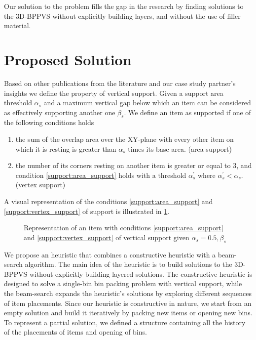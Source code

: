 \documentclass[11pt,a4paper,twocolumn]{article}
\begin{document}
Our solution to the problem fills the gap in the research by finding solutions to the 3D-BPPVS without explicitly building layers, and without the use of filler material.

\section{Proposed Solution}

Based on other publications from the literature and our case study partner's insights we define the property of vertical support.
Given a support area threshold $\alpha_s$ and a maximum vertical gap below which an item can be considered as effectively supporting another one $\beta_s$. We define an item as supported if one of the following conditions holds
\begin{enumerate}[label={\textbf{Condition \arabic*}.},ref={\arabic*},leftmargin=*]
    \item the sum of the overlap area over the XY-plane with every other item on which it is resting is greater than $\alpha_s$ times its base area. (area support) \label{support:area_support}
    \item the number of its corners resting on another item is greater or equal to 3, and condition \ref{support:area_support} holds with a threshold $\alpha^\prime_s$ where $\alpha^\prime_s < \alpha_s$. (vertex support) \label{support:vertex_support}
\end{enumerate}
A visual representation of the conditions \ref{support:area_support} and \ref{support:vertex_support} of support is illustrated in \cref{fig:support}.

\begin{figure}[h]
    \resizebox{\columnwidth}{!}{%
    
    }
    \caption{Representation of an item with conditions \ref{support:area_support} and \ref{support:vertex_support} of vertical support given $\alpha_s = 0.5, \beta_s$}
    \label{fig:support}
\end{figure}

We propose an heuristic that combines a constructive heuristic with a beam-search algorithm.
The main idea of the heuristic is to build solutions to the 3D-BPPVS without explicitly building layered solutions.
The constructive heuristic is designed to solve a single-bin bin packing problem with vertical support, while the beam-search expands the heuristic's solutions by exploring different sequences of item placements.
Since our heuristic is constructive in nature, we start from an empty solution and build it iteratively by packing new items or opening new bins.
To represent a partial solution, we defined a structure containing all the history of the placements of items and opening of bins.
\end{document}
